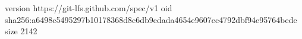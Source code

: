 version https://git-lfs.github.com/spec/v1
oid sha256:a6498c5495297b10178368d8c6db9edada4654e9607ec4792dbf94e95764bede
size 2142
